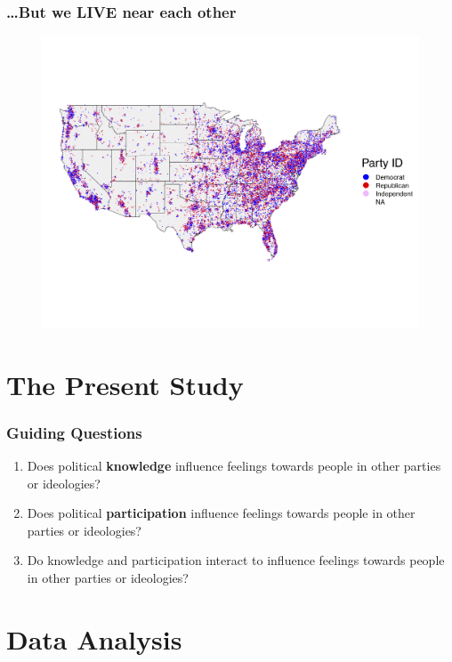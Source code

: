 \documentclass[14pt]{beamer}
\newcommand\tb{\textbf}
\begin{document}
\begin{frame}
\frametitle{\ldots But we LIVE near each other}
\begin{center}
	\begin{figure}[ht!]  
		{	 \includegraphics[width=\textwidth]{USMap}}
	\end{figure}
\end{center}
\end{frame}

\section{The Present Study}



\begin{frame}
\frametitle{Guiding Questions}
\begin{enumerate}
	\item Does political \tb{knowledge} influence feelings towards people in other parties or ideologies?
	\item Does political \tb{participation} influence feelings towards people in other parties or ideologies?
	\item Do knowledge and participation interact to influence feelings towards people in other parties or ideologies?
\end{enumerate}
\end{frame}


\section{Data Analysis}
\end{document}

